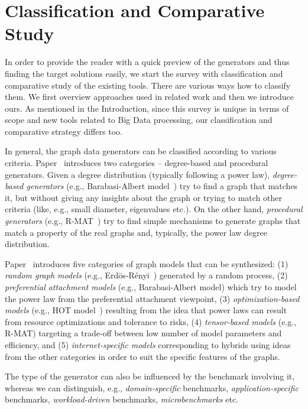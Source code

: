 \section{Classification and Comparative Study}
\label{sec:comparison}

In order to provide the reader with a quick preview of the generators and thus finding the target solutions easily, we start the survey with classification and comparative study of the existing tools. There are various ways how to classify them. We first overview approaches used in related work and then we introduce ours. As mentioned in the Introduction, since this survey is unique in terms of scope and new tools related to Big Data processing, our classification and comparative strategy differs too.

In general, the graph data generators can be classified according to various criteria. Paper~\cite{DBLP:conf/sdm/ChakrabartiZF04} introduces two categories -- degree-based and procedural generators. Given a degree distribution (typically following a power law), \emph{degree-based generators} (e.g., Barabasi-Albert model~\cite{Barabasi99emergenceScaling}) try to find a graph that matches it, but without giving any insights about the graph or trying to match other criteria (like, e.g., small diameter, eigenvalues etc.). On the other hand, \emph{procedural generators} (e.g., R-MAT~\cite{DBLP:conf/sdm/ChakrabartiZF04}) try to find simple mechanisms to generate graphs that match a property of the real graphs and, typically, the power law degree distribution.

Paper~\cite{Chakrabarti:2006:GML:1132952.1132954} introduces five categories of graph models that can be synthesized: (1) \emph{random graph models} (e.g., Erd\"{o}s-R\'{e}nyi~\cite{Erdos:1960}) generated by a random process, (2) \emph{preferential attachment models} (e.g., Barabasi-Albert model) which try to model the power law from the preferential attachment viewpoint, (3) \emph{optimization-based models} (e.g., HOT model~\cite{PhysRevLett.84.2529}) resulting from the idea that power laws can result from resource optimizations and tolerance to risks, (4) \emph{tensor-based models} (e.g., R-MAT) targeting a trade-off between low number of model parameters and efficiency, and (5) \emph{internet-specific models} corresponding to hybrids using ideas from the other categories in order to suit the specific features of the graphs.

The type of the generator can also be influenced by the benchmark involving it, whereas we can distinguish, e.g., \emph{domain-specific} benchmarks, \emph{application-specific} benchmarks, \emph{workload-driven} benchmarks,  \emph{microbenchmarks} etc.



